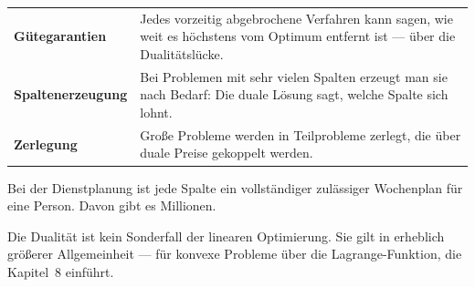 \begin{forschung}
\begin{center}
{\small
\renewcommand{\arraystretch}{1.45}
\begin{tabular}{@{}P{3.0cm}P{5.2cm}@{}}
\toprule
\textbf{Gütegarantien} & Jedes vorzeitig abgebrochene Verfahren kann sagen, wie weit es höchstens vom Optimum entfernt ist --- über die Dualitätslücke.\\
\textbf{Spalten\-erzeugung} & Bei Problemen mit sehr vielen Spalten erzeugt man sie nach Bedarf: Die duale Lösung sagt, welche Spalte sich lohnt.\\
\textbf{Zerlegung} & Große Probleme werden in Teilprobleme zerlegt, die über duale Preise gekoppelt werden.\\
\bottomrule
\end{tabular}}
\end{center}

Bei der Dienstplanung ist jede Spalte ein vollständiger zulässiger Wochenplan für eine Person. Davon gibt es Millionen.

\begin{center}
\begin{minipage}{0.88\textwidth}
\end{minipage}
\end{center}

Die Dualität ist kein Sonderfall der linearen Optimierung. Sie gilt in erheblich größerer Allgemeinheit --- für konvexe Probleme über die Lagrange-Funktion, die Kapitel~8 einführt.

\begin{center}
\begin{minipage}{0.88\textwidth}
\end{minipage}
\end{center}
\end{forschung}

